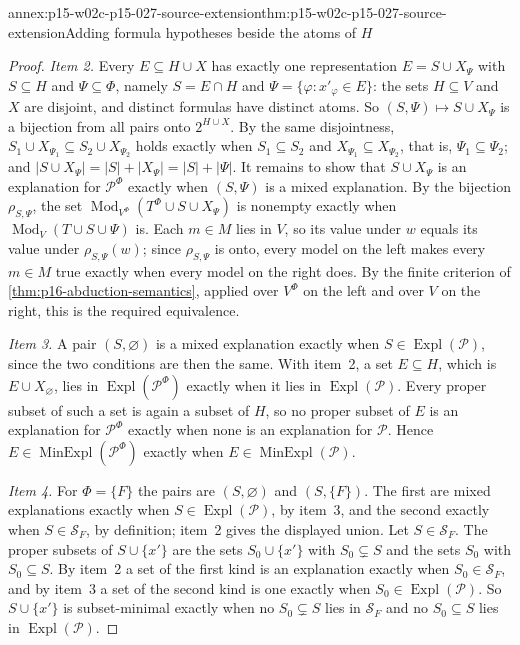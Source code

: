 \begin{annexitem}{annex:p15-w02c-p15-027-source-extension}{thm:p15-w02c-p15-027-source-extension}{Adding formula hypotheses beside the atoms of \texorpdfstring{\(H\)}{H}}
\begin{proof}
\emph{Item 2.} Every \(E\subseteq H\cup X\) has exactly one
representation \(E=S\cup X_\Psi\) with \(S\subseteq H\) and
\(\Psi\subseteq\Phi\), namely \(S=E\cap H\) and
\(\Psi=\{\varphi:x'_\varphi\in E\}\): the sets \(H\subseteq V\) and \(X\)
are disjoint, and distinct formulas have distinct atoms. So
\((S,\Psi)\mapsto S\cup X_\Psi\) is a bijection from all pairs onto
\(2^{H\cup X}\). By the same disjointness,
\(S_1\cup X_{\Psi_1}\subseteq S_2\cup X_{\Psi_2}\) holds exactly when
\(S_1\subseteq S_2\) and \(X_{\Psi_1}\subseteq X_{\Psi_2}\), that is,
\(\Psi_1\subseteq\Psi_2\); and \(|S\cup X_\Psi|=|S|+|X_\Psi|=|S|+|\Psi|\).
It remains to show that \(S\cup X_\Psi\) is an explanation for
\(\mathcal P^{\Phi}\) exactly when \((S,\Psi)\) is a mixed explanation. By
the bijection \(\rho_{S,\Psi}\), the set
\(\operatorname{Mod}_{V^{\Phi}}(T^{\Phi}\cup S\cup X_\Psi)\) is nonempty
exactly when \(\operatorname{Mod}_V(T\cup S\cup\Psi)\) is. Each
\(m\in M\) lies in \(V\), so its value under \(w\) equals its value under
\(\rho_{S,\Psi}(w)\); since \(\rho_{S,\Psi}\) is onto, every model on the
left makes every \(m\in M\) true exactly when every model on the right
does. By the finite criterion of \cref{thm:p16-abduction-semantics},
applied over \(V^{\Phi}\) on the left and over \(V\) on the right, this
is the required equivalence.

\emph{Item 3.} A pair \((S,\varnothing)\) is a mixed explanation exactly
when \(S\in\operatorname{Expl}(\mathcal P)\), since the two conditions are
then the same. With item~2, a set \(E\subseteq H\), which is
\(E\cup X_\varnothing\), lies in \(\operatorname{Expl}(\mathcal P^{\Phi})\)
exactly when it lies in \(\operatorname{Expl}(\mathcal P)\). Every proper
subset of such a set is again a subset of \(H\), so no proper subset of
\(E\) is an explanation for \(\mathcal P^{\Phi}\) exactly when none is an
explanation for \(\mathcal P\). Hence
\(E\in\operatorname{MinExpl}(\mathcal P^{\Phi})\) exactly when
\(E\in\operatorname{MinExpl}(\mathcal P)\).

\emph{Item 4.} For \(\Phi=\{F\}\) the pairs are \((S,\varnothing)\) and
\((S,\{F\})\). The first are mixed explanations exactly when
\(S\in\operatorname{Expl}(\mathcal P)\), by item~3, and the second
exactly when \(S\in\mathcal S_F\), by definition; item~2 gives the
displayed union. Let \(S\in\mathcal S_F\). The proper subsets of
\(S\cup\{x'\}\) are the sets \(S_0\cup\{x'\}\) with \(S_0\subsetneq S\)
and the sets \(S_0\) with \(S_0\subseteq S\). By item~2 a set of the first
kind is an explanation exactly when \(S_0\in\mathcal S_F\), and by item~3
a set of the second kind is one exactly when
\(S_0\in\operatorname{Expl}(\mathcal P)\). So \(S\cup\{x'\}\) is
subset-minimal exactly when no \(S_0\subsetneq S\) lies in
\(\mathcal S_F\) and no \(S_0\subseteq S\) lies in
\(\operatorname{Expl}(\mathcal P)\).


\end{proof}
\end{annexitem}
